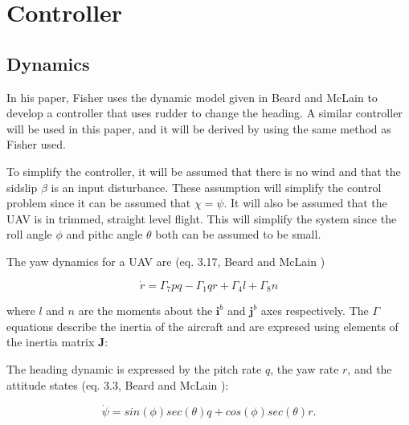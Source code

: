 \section{Controller}

\subsection{Dynamics}
In his paper, Fisher \cite{ratcFISHER} uses the dynamic model given in Beard and McLain \cite{suaBEARD} to develop a controller that uses rudder to change the heading. A similar controller will be used in this paper, and it will be derived by using the same method as Fisher used.

To simplify the controller, it will be assumed that there is no wind and that the sidslip $\beta$ is an input disturbance. These assumption will simplify the control problem since it can be assumed that $\chi = \psi$. It will also be assumed that the UAV is in trimmed, straight level flight. This will simplify the system since the roll angle $\phi$ and pithc angle $\theta$ both can be assumed to be small.

The yaw dynamics for a UAV are (eq. 3.17, Beard and McLain \cite{suaBEARD})

\begin{equation}
	\dot{r} = \Gamma_7pq - \Gamma_1qr + \Gamma_4l + \Gamma_8n
	\label{eq:yaw_dynamics}
\end{equation}

where $l$ and $n$ are the moments about the $\bm{i}^b$ and $\bm{j}^b$ axes respectively. The $\Gamma$ equations describe the inertia of the aircraft and are expresed using elements of the inertia matrix $\bm{J}$:


The heading dynamic is expressed by the pitch rate $q$, the yaw rate $r$, and the attitude states (eq. 3.3, Beard and McLain \cite{suaBEARD}):

\begin{equation}
	\dot{\psi} = sin(\phi)sec(\theta)q + cos(\phi)sec(\theta)r.
\end{equation}

